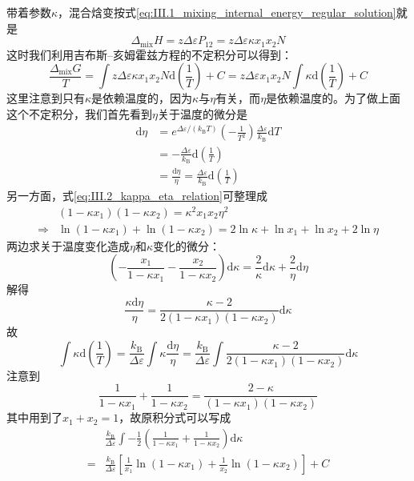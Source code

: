 \documentclass[main.tex]{subfiles}
\begin{document}
带着参数$\kappa$，混合焓变按式\eqref{eq:III.1_mixing_internal_energy_regular_solution}就是
\[\Delta_\text{mix}H=z\Delta\varepsilon P_{12}=z\Delta\varepsilon\kappa x_1x_2N\]
这时我们利用吉布斯--亥姆霍兹方程的不定积分可以得到：
\[\frac{\Delta_\text{mix}G}{T}=\int z\Delta\varepsilon\kappa x_1x_2N\mathrm{d}\left(\frac{1}{T}\right)+C=z\Delta\varepsilon x_1 x_2 N\int\kappa\mathrm{d}\left(\frac{1}{T}\right)+C \]
这里注意到只有$\kappa$是依赖温度的，因为$\kappa$与$\eta$有关，而$\eta$是依赖温度的。为了做上面这个不定积分，我们首先看到$\eta$关于温度的微分是
\begin{align*}
  \mathrm{d}\eta & =e^{\Delta\varepsilon/\left(k_\text{B}T\right)}\left(-\frac{1}{T^2}\right)\frac{\Delta\varepsilon}{k_\text{B}}\mathrm{d}T \\&=-\frac{\Delta\varepsilon}{k_\text{B}}\mathrm{d}\left(\frac{1}{T}\right)\\&=\frac{\mathrm{d}\eta}{\eta}=\frac{\Delta\varepsilon}{k_\text{B}}\mathrm{d}\left(\frac{1}{T}\right)
\end{align*}
另一方面，式\eqref{eq:III.2_kappa_eta_relation}可整理成
\begin{align*}              & \left(1-\kappa x_1\right)\left(1-\kappa x_2\right)=\kappa^2x_1x_2\eta^2 \\\Rightarrow&\ln\left(1-\kappa x_1\right)+\ln\left(1-\kappa x_2\right)=2\ln\kappa+\ln x_1+\ln x_2+2\ln\eta
\end{align*}
两边求关于温度变化造成$\eta$和$\kappa$变化的微分：
\[\left(-\frac{x_1}{1-\kappa x_1}-\frac{x_2}{1-\kappa x_2}\right)\mathrm{d}\kappa=\frac{2}{\kappa}\mathrm{d}\kappa+\frac{2}{\eta}\mathrm{d}\eta\]
解得
\[\frac{\kappa\mathrm{d}\eta}{\eta}=\frac{\kappa-2}{2\left(1-\kappa x_1\right)\left(1-\kappa x_2\right)}\mathrm{d}\kappa\]
故
\[\int\kappa\mathrm{d}\left(\frac{1}{T}\right)=\frac{k_\text{B}}{\Delta\varepsilon}\int\kappa\frac{\mathrm{d}\eta}{\eta}=\frac{k_\text{B}}{\Delta\varepsilon}\int\frac{\kappa-2}{2\left(1-\kappa x_1\right)\left(1-\kappa x_2\right)}\mathrm{d}\kappa\]
注意到
\[\frac{1}{1-\kappa x_1}+\frac{1}{1-\kappa x_2}=\frac{2-\kappa}{\left(1-\kappa x_1\right)\left(1-\kappa x_2\right)}\]
其中用到了$x_1+x_2=1$，故原积分式可以写成
\begin{align*}
    & \frac{k_\text{B}}{\Delta\varepsilon}\int-\frac{1}{2}\left(\frac{1}{1-\kappa x_1}+\frac{1}{1-\kappa x_2}\right)\mathrm{d}\kappa         \\
  = & \frac{k_\text{B}}{\Delta\varepsilon}\left[\frac{1}{x_1}\ln\left(1-\kappa x_1\right)+\frac{1}{x_2}\ln\left(1-\kappa x_2\right)\right]+C
\end{align*}
\end{document}
